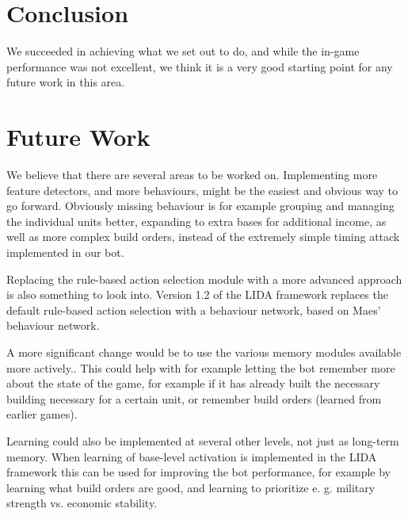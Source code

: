 \section{Conclusion}
\label{sec:conclusion}
We succeeded in achieving what we set out to do, and while the in-game performance was not excellent, we think it is a very good starting point for any future work in this area.

\section{Future Work}
\label{sec:futurework}
We believe that there are several areas to be worked on. Implementing more feature detectors, and more behaviours, might be the easiest and obvious way to go forward. Obviously missing behaviour is for example grouping and managing the individual units better, expanding to extra bases for additional income, as well as more complex build orders, instead of the extremely simple timing attack implemented in our bot.

Replacing the rule-based action selection module with a more advanced approach is also something to look into. Version 1.2 of the LIDA framework replaces the default rule-based action selection with a behaviour network, based on Maes' behaviour network.\cite{maes1989right}

A more significant change would be to use the various memory modules available more actively.\cite{franklin2007lida}. This could help with for example letting the bot remember more about the state of the game, for example if it has already built the necessary building necessary for a certain unit, or remember build orders (learned from earlier games).

Learning could also be implemented at several other levels, not just as long-term memory. When learning of base-level activation is implemented in the LIDA framework this can be used for improving the bot performance, for example by learning what build orders are good, and learning to prioritize e. g. military strength vs. economic stability.
